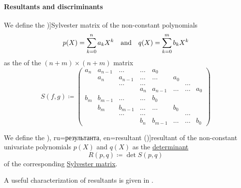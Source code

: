 \paragraph{Resultants and discriminants}

\begin{definition}\label{def:sylvester_matrix}
  We define the \term[ru=матрица Сильвестра, en=Sylvester's matrix (\cite[def. 3.6.2]{CoxLittleOShea2015AlgGeometry})]{Sylvester matrix} of the non-constant polynomials
  \begin{align*}
    p(X) = \sum_{k=0}^n a_k X^k
    &&\T{and}&&
    q(X) = \sum_{k=0}^m b_k X^k
  \end{align*}
  as the  of the \( (n + m) \times (n + m) \) matrix
  \begin{equation*}
    S(f, g) \coloneqq
    \begin{pmatrix}
      a_n    & a_{n-1} & \ldots  & \ldots  & a_0     &        &        &        \\
             & a_n     & a_{n-1} & \ldots  & \ldots  & a_0    &        &        \\
             &         & \ldots  & \ldots  &         &        & \ldots &        \\
             &         &         & a_n     & a_{n-1} & \ldots & \ldots & a_0    \\
      b_m    & b_{m-1} & \ldots  & \ldots  & b_0     &        &        &        \\
             & b_m     & b_{m-1} & \ldots  & \ldots  & b_0    &        &        \\
             &         & \ldots  & \ldots  &         &        & \ldots &        \\
             &         &         & b_n     & b_{m-1} & \ldots & \ldots & b_0
    \end{pmatrix}
  \end{equation*}
\end{definition}

\begin{definition}\label{def:resultant}
  We define the \term[bg=резултанта (\cite[198]{Обрешков1962ВисшаАлгебра}), ru=результанта, en=resultant (\cite[def. 3.6.2]{CoxLittleOShea2015AlgGeometry})]{resultant} of the non-constant univariate polynomials \( p(X) \) and \( q(X) \) as the \hyperref[def:matrix_determinant]{determinant}
  \begin{equation*}
    R(p, q) \coloneqq \det S(p, q)
  \end{equation*}
  of the corresponding \hyperref[def:sylvester_matrix]{Sylvester matrix}.
\end{definition}
\begin{comments}
  \item A useful characterization of resultants is given in .
\end{comments}

